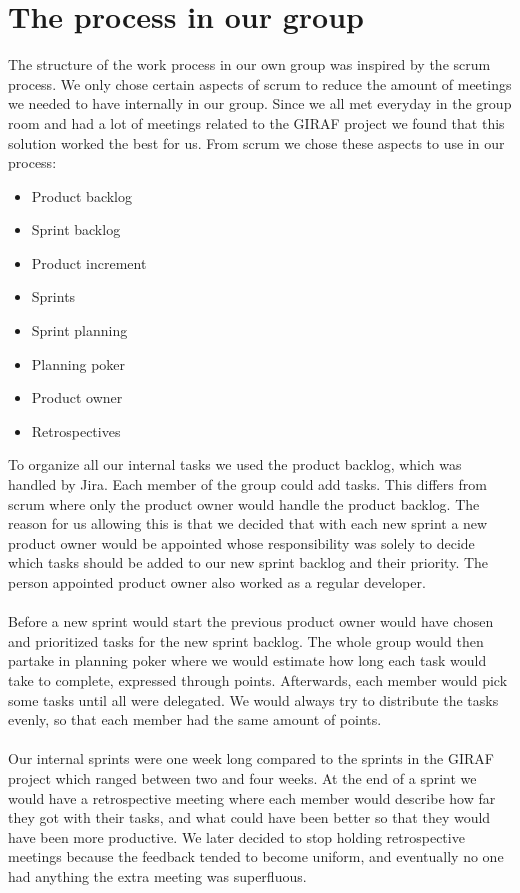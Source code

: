 \section{The process in our group} \label{intro:the-process-in-our-group}

The structure of the work process in our own group was inspired by the scrum process.
We only chose certain aspects of scrum to reduce the amount of meetings we needed to have internally in our group. 
Since we all met everyday in the group room and had a lot of meetings related to the GIRAF project we found that this solution worked the best for us.
From scrum we chose these aspects to use in our process:

 \begin{itemize}
    \item Product backlog
    \item Sprint backlog
    \item Product increment
    \item Sprints
    \item Sprint planning
    \item Planning poker
    \item Product owner
    \item Retrospectives
 \end{itemize}
To organize all our internal tasks we used the product backlog, which was handled by Jira.
Each member of the group could add tasks.
This differs from scrum where only the product owner would handle the product backlog.
The reason for us allowing this is that we decided that with each new sprint a new product owner would be appointed whose responsibility was solely to decide which tasks should be added to our new sprint backlog and their priority.
The person appointed product owner also worked as a regular developer.
\\\\
Before a new sprint would start the previous product owner would have chosen and prioritized tasks for the new sprint backlog.
The whole group would then partake in planning poker where we would estimate how long each task would take to complete, expressed through points.
Afterwards, each member would pick some tasks until all were delegated.
We would always try to distribute the tasks evenly, so that each member had the same amount of points.
\\\\
Our internal sprints were one week long compared to the sprints in the GIRAF project which ranged between two and four weeks.
At the end of a sprint we would have a retrospective meeting where each member would describe how far they got with their tasks, and what could have been better so that they would have been more productive.
We later decided to stop holding retrospective meetings because the feedback tended to become uniform, and eventually no one had anything the extra meeting was superfluous.


